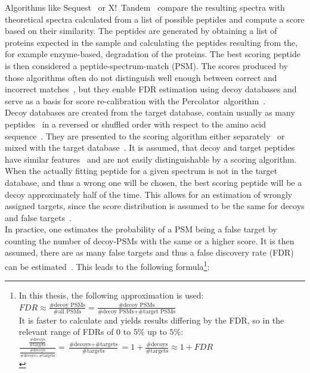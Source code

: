 	Algorithms like Sequest~\cite{Eng1994} or X!~Tandem~\cite{Craig2004} compare the resulting spectra with theoretical spectra calculated from a list of possible peptides and compute a score based on their similarity. The peptides are generated by obtaining a list of proteins expected in the sample and calculating the peptides resulting from the, for example enzyme-based, degradation of the proteins. The best scoring peptide is then considered a peptide-spectrum-match (PSM). The scores produced by those algorithms often do not distinguish well enough between correct and incorrect matches~\cite{Kll2007}, but they enable FDR estimation using decoy databases and serve as a basis for score re-calibration with the Percolator~algorithm~\cite{Kll2007, Granholm2012}.\\
	Decoy databases are created from the target database, contain usually as  many peptides~\cite{Peng2003, Moore2002} in a reversed or shuffled order with respect to the amino acid sequence~\cite{Aggarwal2016}. They are presented to the scoring algorithm either separately~\cite{Granholm2012} or mixed with the target database~\cite{Peng2003}. It is assumed, that decoy and target peptides have similar features~\cite{Moore2002} and are not easily distinguishable by a scoring algorithm. When the actually fitting peptide for a given spectrum is not in the target database, and thus a wrong one will be chosen, the best scoring peptide will be a decoy approximately half of the time. This allows for an estimation of wrongly assigned targets, since the score distribution is assumed to be the same for decoys and false targets~\cite{Aggarwal2016}.\\
	In practice, one estimates the probability of a PSM being a false target by counting the number of decoy-PSMs with the same or a higher score. It is then assumed, there are as many false targets and thus a false discovery rate (FDR) can be estimated~\cite{Granholm2012}. This leads to the following formula\footnote{In this thesis, the following approximation is used:\\
		$FDR \approx \frac{\text{\# decoy PSMs}}{\text{\# all PSMs}} = \frac{\text{\# decoy PSMs}}{\text{\# decoy PSMs} + \text{\# target PSMs}}$\\
		It is faster to calculate and yields results differing by the FDR, so in the relevant range of FDRs of $0$ to $5\%$ up to $5\%$:\\
		$\frac{\frac{\text{\# decoys}}{\text{\# targets}}}{\frac{\text{\# decoys}}{\text{\# decoys} + \text{\# targets}}} = \frac{\text{\# decoys} + \text{\# targets}}{\text{\# targets}} = 1 + \frac{\text{\# decoys}}{\text{\# targets}} \approx 1 + FDR$\\}:
